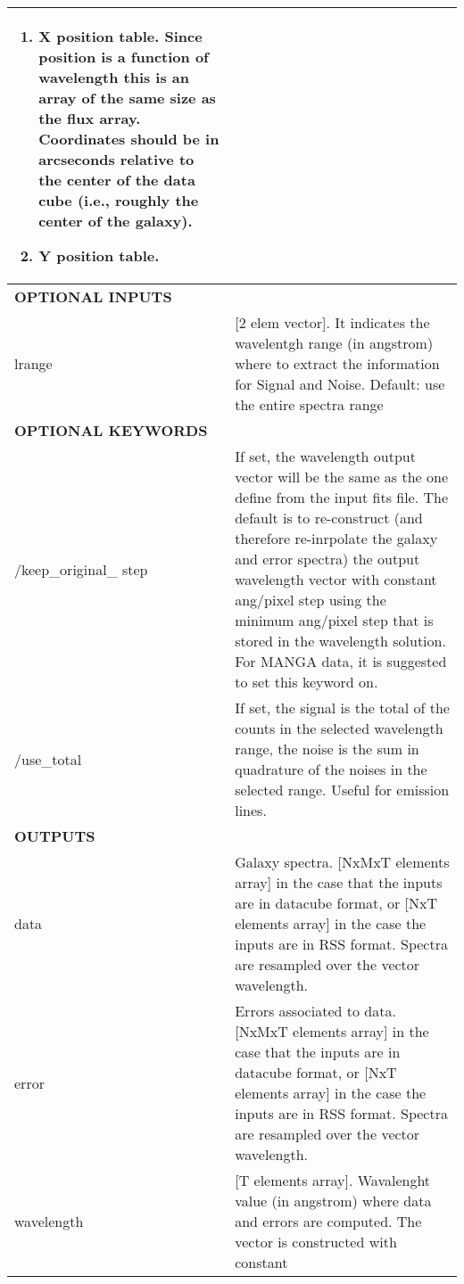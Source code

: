 \begin{center}
\begin{longtable}{p{2.7cm}| p{11.1cm}}
\begin{enumerate}
                            \item X position table.  Since position is a function of wavelength this is an 
                               array of the same size as the flux array.  Coordinates should be in arcseconds 
                               relative to the center of the data cube (i.e., roughly the center of the galaxy).
                            \item Y position table.
                            \end{enumerate}\\
%
\hline
{\bf  OPTIONAL INPUTS}  & \\
\hline
lrange & [2 elem vector]. It indicates the wavelentgh range (in angstrom) where to
       extract the information for Signal and Noise. Default: use the entire spectra range \\
%
\hline {\bf OPTIONAL KEYWORDS} &  \\ 
\hline 
/keep\_original\_ step & If set, the wavelength output vector will be the same as the one
                         define from the input fits file. The default
                         is to re-construct (and  therefore re-inrpolate the galaxy and error
                         spectra) the output wavelength vector with constant ang/pixel step
                         using the minimum ang/pixel step that is stored in the wavelength
                         solution. For MANGA data, it is suggested to set this keyword on.\\
%
 /use\_total           &   If set, the signal is the total of the counts in the selected wavelength range, the noise is the sum in
                         quadrature of the noises in the selected range. Useful for emission lines.\\
\hline
{\bf  OUTPUTS} &  \\
\hline
data           &  Galaxy spectra. [NxMxT elements array] in the case that the inputs are in datacube format, or [NxT elements array]
               in the case the inputs are in RSS format. Spectra are resampled over the vector wavelength.    \\
%
error          & Errors associated to data. [NxMxT elements array] in the case that the inputs are in datacube format, or [NxT elements array]
               in the case the inputs are in RSS format. Spectra are resampled over the vector wavelength. \\
%
wavelength     & [T elements array]. Wavalenght value (in angstrom)  where data and errors are computed. The vector is constructed with constant 

\end{longtable}
\end{center}
